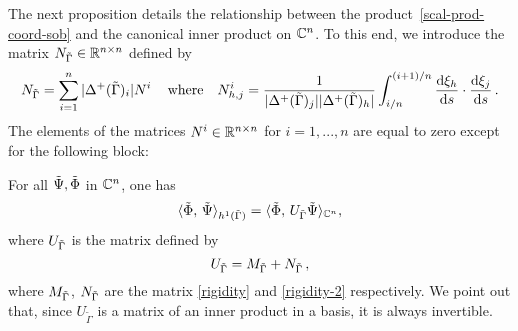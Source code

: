 The next proposition  details the relationship between the product~\eqref{scal-prod-coord-sob} and the canonical inner product on $\mathbb{C}^n$. To this end, we introduce  the  matrix $N_{\tilde{\Gamma}} \in \mathbb{R}^{n \times n}$  defined by
\begin{equation}\label{rigidity-2}
	N_{\tilde{\Gamma}} = \sum_{i=1}^n |\Delta^+(\tilde{\Gamma})_i| N^i\,
	\quad \text{where} \quad
	N^i_{h,j}=\frac{1}{|\Delta^+(\tilde{\Gamma})_j||\Delta^+(\tilde{\Gamma})_h|}\int_{i/n}^{(i+1)/n}\frac{\mathrm{d}\xi_h}{\mathrm{d} s}\cdot\frac{\mathrm{d}\xi_j}{\mathrm{d} s}\,.
\end{equation} 
The elements of the matrices $N^i \in \mathbb{R}^{n \times n}$ for $i=1,...,n$ are equal to zero except for the following block:  
 


\begin{prop}\label{prod-scla-cont-sob} For all $\tilde{\Psi}, \tilde{\Phi}$ in $\mathbb{C}^n$, one has
\begin{equation}\label{discreteprod-sob}
 	\langle \tilde{\Phi},\,\tilde{\Psi}\rangle_{h^1(\tilde{\Gamma})}
	= 
	\langle \tilde{\Phi},\,U_{\tilde{\Gamma}}\tilde{\Psi}\rangle_{\mathbb{C}^n}, 
\end{equation}
where $U_{\tilde{\Gamma}}$ is the matrix defined by 
\begin{equation}\label{rigidity-mass-h1}
U_{\tilde{\Gamma}} = M_{\tilde{\Gamma}} +  N_{\tilde{\Gamma}} \,,
\end{equation}
where $M_{\tilde{\Gamma}}$, $N_{\tilde{\Gamma}}$  are the   matrix \eqref{rigidity} and \eqref{rigidity-2} respectively. 
We point out that, since $U_{\tilde\Gamma}$ is a  matrix of an inner product in a basis,  it is always invertible.
\end{prop}


